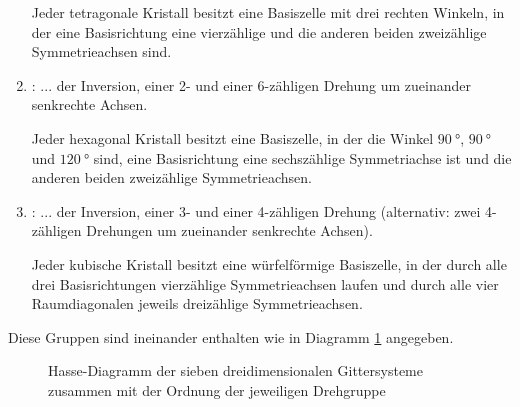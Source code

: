 \begin{theoremdef}
\begin{enumerate}
Jeder tetragonale Kristall besitzt eine Basiszelle mit drei rechten Winkeln, in der eine Basisrichtung eine vierzählige und die anderen beiden zweizählige Symmetrieachsen sind.

\item {}: ... der Inversion, einer 2- und einer 6-zähligen Drehung um zueinander senkrechte Achsen.

Jeder hexagonal Kristall besitzt eine Basiszelle, in der die Winkel $\SI{90}{\degree}$, $\SI{90}{\degree}$ und $\SI{120}{\degree}$ sind, eine Basisrichtung eine sechszählige Symmetriachse ist und die anderen beiden zweizählige Symmetrieachsen.

\item {}: ... der Inversion, einer 3- und einer 4-zähligen Drehung (alternativ: zwei 4-zähligen Drehungen um zueinander senkrechte Achsen).

Jeder kubische Kristall besitzt eine würfelförmige Basiszelle, in der durch alle drei Basisrichtungen vierzählige Symmetrieachsen laufen und durch alle vier Raumdiagonalen jeweils dreizählige Symmetrieachsen.
\end{enumerate}
Diese Gruppen sind ineinander enthalten wie in Diagramm \ref{kristalle:hasse_diagramm_Gittersysteme} angegeben.
\end{theoremdef}

\begin{figure}[ht]
\caption{Hasse-Diagramm der sieben dreidimensionalen Gittersysteme zusammen mit der Ordnung der jeweiligen Drehgruppe}
\label{kristalle:hasse_diagramm_Gittersysteme}
\end{figure}

